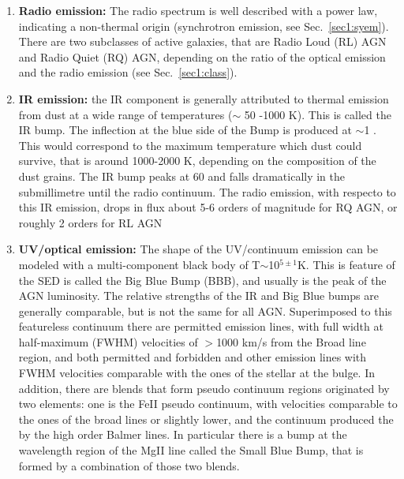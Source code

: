 \begin{enumerate}

\item \textbf{Radio emission:} The radio spectrum is well described with a power law, indicating a non-thermal origin (synchrotron emission, see Sec.~\ref{sec1:syem}). There are two subclasses of active galaxies, that are Radio Loud (RL) AGN and Radio Quiet (RQ) AGN, depending on the ratio of the optical emission and the radio emission (see Sec.~\ref{sec1:class}). 

\item \textbf{IR emission:} the IR component is generally attributed to thermal emission from dust at a wide range of temperatures ($\sim$ 50 -1000 K). This is called the IR bump. The inflection at the blue side of the Bump is produced at $\sim$1 \um. This would correspond to the maximum temperature which dust could survive, that is around 1000-2000 K, depending on the composition of the dust grains. The IR bump peaks at 60 \um and falls dramatically in the submillimetre until the radio continuum. The radio emission, with respecto to this IR emission, drops in flux about 5-6 orders of magnitude for RQ AGN, or roughly 2 orders for RL AGN



\item \textbf{UV/optical emission:} The shape of the UV/continuum emission can be modeled with a multi-component black body of T$\sim$10$^{5\pm1}$K. This is feature of the SED is called the Big Blue Bump (BBB), and usually is the peak of the AGN luminosity. The relative strengths of the IR and Big Blue bumps are generally comparable, but is not the same for all AGN. Superimposed to this featureless continuum there are permitted emission lines, with full width at half-maximum (FWHM) velocities of $>$1000 km/s from the Broad line region, and both permitted and forbidden and other emission lines with FWHM velocities comparable with the ones of the stellar at the bulge. In addition, there are blends that form pseudo continuum regions originated by two elements: one is the FeII pseudo continuum, with velocities comparable to the ones of the broad lines or slightly lower, and the continuum produced the by  the high order Balmer lines. In particular there is a bump at the wavelength region of the MgII line called the Small Blue Bump, that is formed by a combination of those two blends.  


\end{enumerate}
